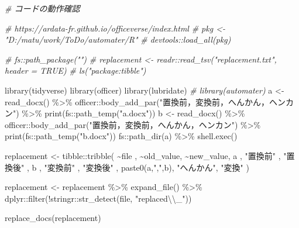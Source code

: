 \documentclass[
]{article}
\newenvironment{Shaded}{\begin{snugshade}}{\end{snugshade}}
\newcommand{\CommentTok}[1]{\textcolor[rgb]{0.56,0.35,0.01}{\textit{#1}}}
\newcommand{\FunctionTok}[1]{\textcolor[rgb]{0.00,0.00,0.00}{#1}}
\newcommand{\NormalTok}[1]{#1}
\newcommand{\OtherTok}[1]{\textcolor[rgb]{0.56,0.35,0.01}{#1}}
\newcommand{\SpecialCharTok}[1]{\textcolor[rgb]{0.00,0.00,0.00}{#1}}
\newcommand{\StringTok}[1]{\textcolor[rgb]{0.31,0.60,0.02}{#1}}
\begin{document}
\begin{Shaded}
\begin{Highlighting}[]
  \CommentTok{\# コードの動作確認}

  \CommentTok{\# https://ardata{-}fr.github.io/officeverse/index.html}
  \CommentTok{\# pkg \textless{}{-} "D:/matu/work/ToDo/automater/R"}
  \CommentTok{\# devtools::load\_all(pkg)}

  \CommentTok{\# fs::path\_package("")}
  \CommentTok{\# replacement \textless{}{-} readr::read\_tsv("replacement.txt", header = TRUE)}
  \CommentTok{\# ls("package:tibble")}

\FunctionTok{library}\NormalTok{(tidyverse)}
\FunctionTok{library}\NormalTok{(officer)}
\FunctionTok{library}\NormalTok{(lubridate)}
  \CommentTok{\# library(automater)}
\NormalTok{a }\OtherTok{\textless{}{-}} 
  \FunctionTok{read\_docx}\NormalTok{() }\SpecialCharTok{\%\textgreater{}\%}
\NormalTok{  officer}\SpecialCharTok{::}\FunctionTok{body\_add\_par}\NormalTok{(}\StringTok{"置換前，変換前，へんかん，ヘンカン"}\NormalTok{) }\SpecialCharTok{\%\textgreater{}\%}
  \FunctionTok{print}\NormalTok{(fs}\SpecialCharTok{::}\FunctionTok{path\_temp}\NormalTok{(}\StringTok{"a.docx"}\NormalTok{))}
\NormalTok{b }\OtherTok{\textless{}{-}} 
  \FunctionTok{read\_docx}\NormalTok{() }\SpecialCharTok{\%\textgreater{}\%}
\NormalTok{  officer}\SpecialCharTok{::}\FunctionTok{body\_add\_par}\NormalTok{(}\StringTok{"置換前，変換前，へんかん，ヘンカン"}\NormalTok{) }\SpecialCharTok{\%\textgreater{}\%}
  \FunctionTok{print}\NormalTok{(fs}\SpecialCharTok{::}\FunctionTok{path\_temp}\NormalTok{(}\StringTok{"b.docx"}\NormalTok{))}
\NormalTok{fs}\SpecialCharTok{::}\FunctionTok{path\_dir}\NormalTok{(a) }\SpecialCharTok{\%\textgreater{}\%}
  \FunctionTok{shell.exec}\NormalTok{()}

\NormalTok{replacement }\OtherTok{\textless{}{-}} 
\NormalTok{  tibble}\SpecialCharTok{::}\FunctionTok{tribble}\NormalTok{(}
    \SpecialCharTok{\textasciitilde{}}\NormalTok{file          , }\SpecialCharTok{\textasciitilde{}}\NormalTok{old\_value, }\SpecialCharTok{\textasciitilde{}}\NormalTok{new\_value,}
\NormalTok{    a              , }\StringTok{"置換前"}\NormalTok{  , }\StringTok{"置換後"}\NormalTok{  ,}
\NormalTok{    b              , }\StringTok{"変換前"}\NormalTok{  , }\StringTok{"変換後"}\NormalTok{  ,}
    \FunctionTok{paste0}\NormalTok{(a,}\StringTok{","}\NormalTok{,b), }\StringTok{"へんかん"}\NormalTok{, }\StringTok{"変換"}\NormalTok{    )}

\NormalTok{replacement }\OtherTok{\textless{}{-}} 
\NormalTok{  replacement }\SpecialCharTok{\%\textgreater{}\%}
  \FunctionTok{expand\_file}\NormalTok{() }\SpecialCharTok{\%\textgreater{}\%}
\NormalTok{  dplyr}\SpecialCharTok{::}\FunctionTok{filter}\NormalTok{(}\SpecialCharTok{!}\NormalTok{stringr}\SpecialCharTok{::}\FunctionTok{str\_detect}\NormalTok{(file, }\StringTok{"replaced}\SpecialCharTok{\textbackslash{}\textbackslash{}}\StringTok{\_"}\NormalTok{))}

\FunctionTok{replace\_docs}\NormalTok{(replacement)}
\end{Highlighting}
\end{Shaded}
\end{document}
